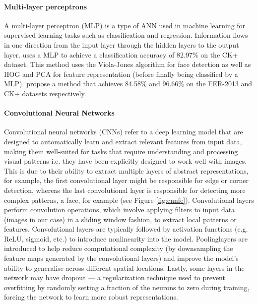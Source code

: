 \documentclass[12pt, a4paper]{article}
\begin{document}
\paragraph{Multi-layer perceptrons}

A multi-layer perceptron (MLP) is a type of ANN used in machine learning for supervised learning tasks such as classification and regression. Information flows in one direction from the input layer through the hidden layers to the output layer. \cite{dino2019facial} uses a MLP to achieve a classification accuracy of 82.97\% on the CK+ dataset. This method uses the Viola-Jones algorithm \citep{viola2001rapid} for face detection as well as HOG and PCA for feature representation (before finally being classified by a MLP). \cite{boughrara2016facial} propose a method that achieves 84.58\% and 96.66\% on the FER-2013 and CK+ datasets respectively.

\paragraph{Convolutional Neural Networks}

Convolutional neural networks (CNNs) refer to a deep learning model that are designed to automatically learn and extract relevant features from input data, making them well-suited for tasks that require understanding and processing visual patterns i.e. they have been explicitly designed to work well with images.  This is due to their ability to extract multiple layers of abstract representations, for example, the first convolutional layer might be responsible for edge or corner detection, whereas the last convolutional layer is responsible for detecting more complex patterns, a face, for example (see Figure \ref{fig:cnnfe}). Convolutional layers perform convolution operations, which involve applying filters to input data (images in our case) in a sliding window fashion, to extract local patterns or features. Convolutional layers are typically followed by activation functions (e.g. ReLU, sigmoid, etc.) to introduce nonlinearity into the model. Poolinglayers are introduced to help reduce computational complexity (by downsampling the feature maps generated by the convolutional layers) and improve the model's ability to generalise across different spatial locations. Lastly, some layers in the network may have dropout --- a regularization technique used to prevent overfitting by randomly setting a fraction of the neurons to zero during training, forcing the network to learn more robust representations.
\end{document}
